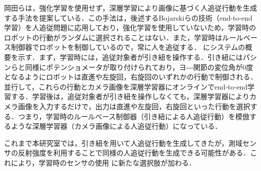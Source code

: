   岡田ら\cite{okada}は，強化学習を使用せず，深層学習により画像に基づく人追従行動を生成する手法を提案している．この手法は，後述するBojarskiら\cite{bojarski}の技術（end-to-end学習）を人追従問題に応用しており，強化学習を使用していないため，学習時のロボットの行動がランダムに選択されることはない．また，学習時はルールベース制御器でロボットを制御しているので，常に人を追従する．
  にシステムの概要を示す．まず，学習時には，追従対象者が引き紐を操作する．引き紐にはパシンらと同様にポテンショメータが取り付けられており，ヨ―関節の変位角が0度となるようにロボットは直進や左旋回，右旋回のいずれかの行動で制御される．並行して，これらの行動とカメラ画像を深層学習器にオンラインでend-to-end学習する．学習後は，追従対象者が引き紐を操作しなくても，深層学習器によりカメラ画像を入力するだけで，出力は直進や左旋回，右旋回といった行動を選択する．つまり，学習時のルールベース制御器（引き紐による人追従行動）を模倣するような深層学習器（カメラ画像による人追従行動）になっている．

  これまで本研究室では，引き紐を用いて人追従行動を生成してきたが，測域センサの反射強度を利用することで同様の人追従行動を生成できる可能性がある．これにより，学習時のセンサの使用
  に新たな選択肢が加わる．

\newpage

